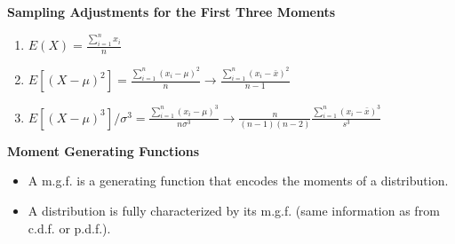 \documentclass[11pt]{article}
\begin{document}
\textbf{Sampling Adjustments for the First Three Moments}
\begin{enumerate}
    \item $E(X)=\frac{\sum_{i=1}^{n} x_i}{n}$
    \item $E[{(X-\mu)}^2]=\frac{\sum_{i=1}^{n} {(x_i-\mu)}^2}{n} \to \frac{\sum_{i=1}^{n} {(x_i-\bar{x})}^2}{n-1}$
    \item $E[{(X-\mu)}^3]/\sigma^3=\frac{\sum_{i=1}^{n} {(x_i-\mu)}^3}{n\sigma^3} \to \frac{n}{(n-1)(n-2)}\frac{\sum_{i=1}^{n} {(x_i-\bar{x})}^3}{s^3}$
\end{enumerate}

\textbf{Moment Generating Functions}
\begin{itemize}
    \item A m.g.f. is a generating function that encodes the moments of a distribution.
    \item A distribution is fully characterized by its m.g.f. (same information as from c.d.f.
    or p.d.f.).
\end{itemize}
\end{document}
